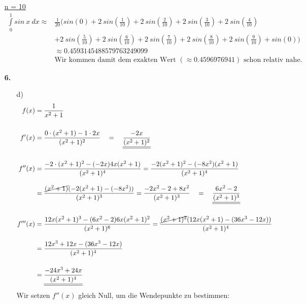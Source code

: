\documentclass[a4paper,11pt]{article}
\begin{document}
\begin{enumerate}
            \underline{n = 10}
            \begin{align*}
            \int\limits_{0}^{1} sin \ x \ dx \approx &\frac{1}{20}\Bigg(sin(0) + 2 \ sin \left(\frac{1}{10}\right)+ 2 \ sin \left(\frac{2}{10}\right)+ 2 \ sin \left(\frac{3}{10}\right)+ 2 \ sin \left(\frac{4}{10}\right) \\ 
            &+ 2 \ sin \left(\frac{5}{10}\right)+ 2 \ sin \left(\frac{6}{10}\right)+ 2 \ sin \left(\frac{7}{10}\right)+ 2 \ sin \left(\frac{8}{10}\right)+ 2 \ sin \left(\frac{9}{10}\right)+  sin(0)\Bigg) \\[0.5cm]
            &\approx 0.4593145488579763249099 \\
            &\text{Wir kommen damit dem exakten Wert $(\approx 0.4596976941)$ schon relativ nahe.}
            \end{align*}
        \item[\textbf{6.}]
            \begin{enumerate}
                \item [d)]
                \begin{align*}
                    f(x) &= \frac{1}{x^2+1} \\[0.5cm]
                    f'(x) &= \frac{0 \cdot (x^2+1) - 1 \cdot 2x}{(x^2+1)^2}  \quad
                    = \quad  \underline{\underline{\frac{-2x}{(x^2+1)^2}}} \\[0.5cm]
                    f''(x) &= \frac{-2 \cdot (x^2 +1)^2 - (-2x)4x(x^2+1)}{(x^2+1)^4} 
                    = \frac{-2(x^2+1)^2 - (-8x^2)(x^2+1)}{(x^2+1)^4} \\[0.3cm]
                    &= \frac{\cancel{(x^2+1)}(-2(x^2+1)-(-8x^2))}{(x^2+1)^3} 
                    = \frac{-2x^2-2+8x^2}{(x^2+1)^3} 
                    \quad = \quad  \underline{\underline{\frac{6x^2-2}{(x^2+1)^3}}} \\[0.5cm]
                    f'''(x) &= \frac{12x(x^2+1)^3 -(6x^2-2)6x(x^2+1)^2}{(x^2+1)^6} 
                    = \frac{\cancel{(x^2+1)^2}(12x(x^2+1)-(36x^3-12x))}{(x^2+1)^4}\\[0.3cm]
                    &= \frac{12x^3+12x-(36x^3-12x)}{(x^2+1)^4} \\[0.4cm]
                    &= \underline{\underline{\frac{-24x^3+24x}{(x^2+1)^4}}} \\
                \end{align*}
                Wir setzen $f''(x)$ gleich Null, um die Wendepunkte zu bestimmen:
                \begin{align*}

\end{align*}
\end{enumerate}
\end{enumerate}
\end{document}
